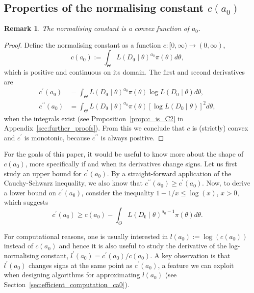 \documentclass[a4paper, notitlepage, 11pt]{article}
\newtheorem{remark}{Remark}[]
\begin{document}
\subsection{Properties of the normalising constant $c(a_0)$}

\begin{remark}
\label{rmk:convex_norm_constant}
 The normalising constant is a convex function of $a_0$.
\end{remark}
\begin{proof}
Define the normalising constant as a function $c : [0, \infty) \to (0, \infty)$,
\begin{equation}
 \label{eq:normconst}
 c(a_0) := \int_{\Theta} L(D_0\mid\theta)^{a_0} \pi(\theta)d\theta,
\end{equation}
which is positive and continuous on its domain.
The first and second derivatives are
\begin{align}
\label{eq:derivative_ca0}
c^\prime(a_0) &= \int_{\Theta} L(D_0\mid\theta)^{a_0} \pi(\theta) \log L(D_0\mid\theta) d\theta, \\
c^{\prime\prime}(a_0) &= \int_{\Theta} L(D_0\mid\theta)^{a_0} \pi(\theta) [\log L(D_0\mid\theta)]^2 d\theta,
\end{align}
when the integrals exist (see Proposition~\ref{prop:c_is_C2} in Appendix~\ref{sec:further_proofs}). %
From this we conclude that $c$ is (strictly) convex and $c^\prime$ is monotonic, because $c^{\prime\prime}$ is always positive.
\end{proof}
For the goals of this paper, it would be useful to know more about the shape of $c(a_0)$, more specifically if and when its derivatives change signs.
Let us first study an upper bound for $c^\prime(a_0)$.
By a straight-forward application of the Cauchy-Schwarz inequality, we also know that $c^{\prime\prime}(a_0) \geq c^\prime(a_0)$.
Now, to derive a lower bound on $c^\prime(a_0)$, consider the inequality $ 1- 1/x \leq \log(x)$, $x >0$, which suggests
\begin{equation*}
 \label{eq:c_a0_deriv_lb}
 c^\prime(a_0) \geq c(a_0) - \int_{\Theta} L(D_0\mid\theta)^{a_0-1} \pi(\theta) d\theta.
\end{equation*}

For computational reasons, one is usually interested in $l(a_0) := \log(c(a_0)) $ instead of $c(a_0)$ and hence it is also useful to study the derivative of the log-normalising constant, $l^\prime(a_0) = c^\prime(a_0)/c(a_0)$.
A key observation is that $l^\prime(a_0)$ changes signs at the same point as $c^\prime(a_0)$, a feature we can exploit when designing algorithms for approximating $l(a_0)$ (see Section~\ref{sec:efficient_computation_ca0}). 
\end{document}
